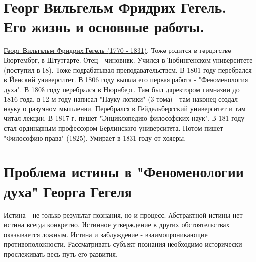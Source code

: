 \section{Георг Вильгельм Фридрих Гегель. Его жизнь и основные работы.}
\underline{Георг Вильгельм Фридрих Гегель (1770 - 1831)}. Тоже родится в герцогстве Вюртембрг, в Штутгарте. Отец - чиновник.
Учился в Тюбингенском университете (поступил в 18). Тоже подрабатывал преподавательством. В 1801 году перебрался в Йенский университет. В 1806 году вышла его первая работа - "Феноменология духа". В 1808 году перебрался в Нюрнберг. Там был директором гимназии до 1816 года. в 12-м году написал "Науку логики" (3 тома) - там наконец создал науку о разумном мышлении. Перебрался в Гейдельбергский университет и там читал лекции. В 1817 г. пишет "Энциклопедию философских наук". В 181 году стал ординарным профессором Берлинского университета. Потом пишет "Философию права" (1825). Умирает в 1831 году от холеры.


 
\section{Проблема истины в "Феноменологии духа" Георга Гегеля}
Истина - не только результат познания, но и процесс. Абстрактной истины нет - истина всегда конкретно. Истинное утверждение в других обстоятельствах оказывается ложным. Истина и заблуждение - взаимопроникающие противоположности. Рассматривать субъект познания необходимо исторически - прослеживать весь путь его развития.


